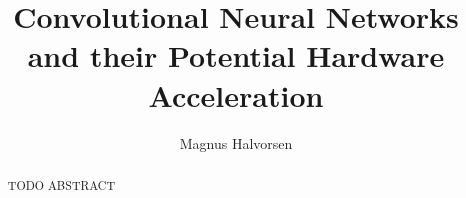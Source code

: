 \documentclass[a4paper]{report}
\title{Convolutional Neural Networks and their Potential Hardware Acceleration}
\author{Magnus Halvorsen}
\begin{document}

\setcounter{page}{0}

\begin{abstract}


TODO ABSTRACT

\end{abstract}
\tableofcontents
\listoffigures
\listoftables
\setcounter{page}{0}









%
\end{document}
